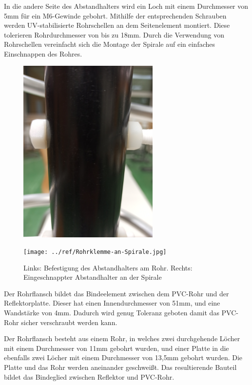 In die andere Seite des Abstandhalters wird ein Loch mit einem Durchmesser von 5mm für ein M6-Gewinde gebohrt. Mithilfe der entsprechenden Schrauben werden UV-stabilisierte Rohrschellen an dem Seitenelement montiert. Diese tolerieren Rohrdurchmesser von bis zu 18mm. Durch die Verwendung von Rohrschellen vereinfacht sich die Montage der Spirale auf ein einfaches Einschnappen des Rohres.

\begin{figure}[H]
	\begin{minipage}[b]{.4\linewidth} %
		\includegraphics[width=7cm, angle=270]{../ref/Befestigung-Querelement.jpg}
		\label{fig:Abstandhalter-Befestigung}
	\end{minipage}
	\hspace{.1\linewidth}%
	\begin{minipage}[b]{.4\linewidth} %
		\texttt{[image: ../ref/Rohrklemme-an-Spirale.jpg]}
		\label{fig:Seitenelement-an-Spirale}
	\end{minipage}
	\caption{Links: Befestigung des Abstandhalters am Rohr. Rechts: Eingeschnappter Abstandhalter an der Spirale}
\end{figure}

Der Rohrflansch bildet das Bindeelement zwischen dem PVC-Rohr und der Reflektorplatte. Dieser hat einen Innendurchmesser von 51mm, und eine Wandstärke von 4mm. Dadurch wird genug Toleranz geboten damit das PVC-Rohr sicher verschraubt werden kann. 

Der Rohrflansch besteht aus einem Rohr, in welches zwei durchgehende Löcher mit einem Durchmesser von 11mm gebohrt wurden, und einer Platte in die ebenfalls zwei Löcher mit einem Durchmesser von 13,5mm gebohrt wurden. Die Platte und das Rohr werden aneinander geschweißt. Das resultierende Bauteil bildet das Bindeglied zwischen Reflektor und PVC-Rohr.

